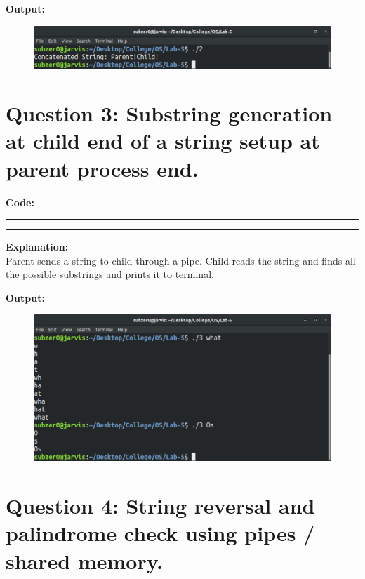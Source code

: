 \documentclass{article}
\begin{document}
\bigskip
\noindent
\textbf{\Large Output:}

\begin{figure}[h]
	\includegraphics[width=\textwidth]{output/2.png}
\end{figure}
\bigskip

\section*{Question 3: Substring generation at child end of a string setup at parent process end.}
\bigskip
\bigskip

\par\noindent
\textbf{\Large Code: }
\smallskip
\par\noindent\rule{\textwidth}{0.4pt}

\par\noindent\rule{\textwidth}{0.4pt}

\bigskip
\noindent
\textbf{\Large Explanation: } \\

Parent sends a string to child through a pipe. Child reads
the string and finds all the possible substrings and prints
it to terminal.
\pagebreak

\bigskip
\noindent
\textbf{\Large Output:}

\begin{figure}[h]
	\includegraphics[width=\textwidth]{output/3.png}
\end{figure}
\bigskip

\section*{Question 4: String reversal and palindrome check using pipes / shared memory.}
\bigskip
\bigskip
\end{document}
